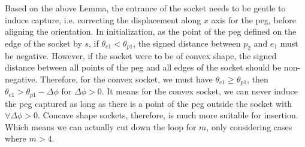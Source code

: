 \documentclass[11pt, twocolumn]{article}
\newtheorem{lemma}[theorem]{Lemma}
\begin{document}






Based on the above Lemma, the entrance of the socket needs to be gentle to induce capture, i.e. correcting the displacement along $x$ axis for the peg, before aligning the orientation. In initialization, as the point of the peg defined on the edge of the socket by $s$, if $ \theta_{e1} < \theta_{p1} $, the signed distance between $p_2$ and $e_1$ must be negative. However, if the socket were to be of convex shape, the signed distance between all points of the peg and all edges of the socket should be non-negative.  Therefore, for the convex socket, we must have $ \theta_{e1} \ge \theta_{p1} $, then $ \theta_{e1} > \theta_{p1} - \Delta\phi$ for $\Delta\phi > 0$. It means for the convex socket, we can never induce the peg captured as long as there is a point of the peg outside the socket with $\forall \Delta\phi > 0$. Concave shape sockets, therefore, is much more suitable for insertion. Which means we can actually cut down the loop for $m$, only considering cases where $m > 4$. 
\end{document}
